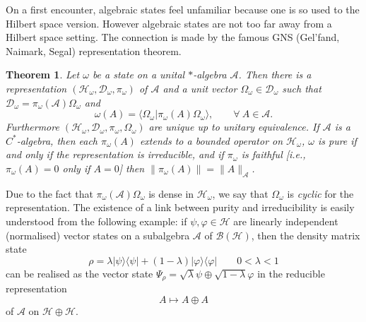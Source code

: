\documentclass[12pt,a4paper]{article}
\newcommand{\1}{\mathds{1}}                         %
\newcommand{\BB}{{\mathcal{B}}}
\newcommand{\HH}{{\mathcal{H}}}
\newcommand{\DD}{{\mathscr{D}}}
\newcommand{\Ac}{{\mathcal{A}}}
\newcommand{\ip}[2]{\langle #1|#2\rangle}
\newcommand{\ket}[1]{|#1\rangle}
\newcommand{\bra}[1]{\langle #1|}
\newtheorem{theorem}{Theorem}%
\begin{document}
On a first encounter, algebraic states feel unfamiliar because one is so used to the Hilbert space version. However algebraic states are not too far away from a Hilbert space setting. The connection is made by the famous GNS (Gel'fand, Naimark, Segal) representation theorem. 
\begin{theorem} Let $\omega$ be a state on a unital $*$-algebra $\Ac$. 
	Then there is a representation $(\HH_\omega,\DD_\omega,\pi_\omega)$
	of $\Ac$ and a unit
	vector $\Omega_\omega\in\DD_\omega$ such that $\DD_\omega=\pi_\omega(\Ac)\Omega_\omega$ and
	\begin{equation}\label{eq:GNSprop}
	\omega(A) =\ip{\Omega_\omega}{\pi_\omega(A)\Omega_\omega}, \qquad \forall~A\in \Ac.
	\end{equation}
	Furthermore $(\HH_\omega,\DD_\omega,\pi_\omega,\Omega_\omega)$ are unique up to unitary equivalence. If $\Ac$ is a $C^*$-algebra,
	then each $\pi_\omega(A)$ extends to a bounded operator on $\HH_\omega$, 
	$\omega$ is pure if and only if the representation is irreducible, 
	and if $\pi_\omega$ is faithful [i.e., $\pi_\omega(A)=0$ only if $A=0$] then $\|\pi_\omega(A)\|=\|A\|_{\Ac}$.
\end{theorem}
Due to the fact that $\pi_\omega(\Ac)\Omega_\omega$ is dense in $\HH_\omega$, we say that $\Omega_\omega$ is \emph{cyclic} for the representation.
The existence of a link between purity and irreducibility is easily understood from the following example: if $\psi,\varphi\in\HH$ are linearly independent (normalised) vector states on a subalgebra $\Ac$ of $\BB(\HH)$, then the density matrix state
\[
\rho = \lambda \ket{\psi}\bra{\psi} + (1-\lambda)\ket{\varphi}\bra{\varphi}\qquad
0<\lambda<1
\]
can be realised as the vector state $\Psi_\rho=\sqrt{\lambda}\psi\oplus \sqrt{1-\lambda}\varphi$ in the reducible representation
\[
A\mapsto A\oplus A
\]
of $\Ac$ on $\HH\oplus\HH$.

\end{document}
